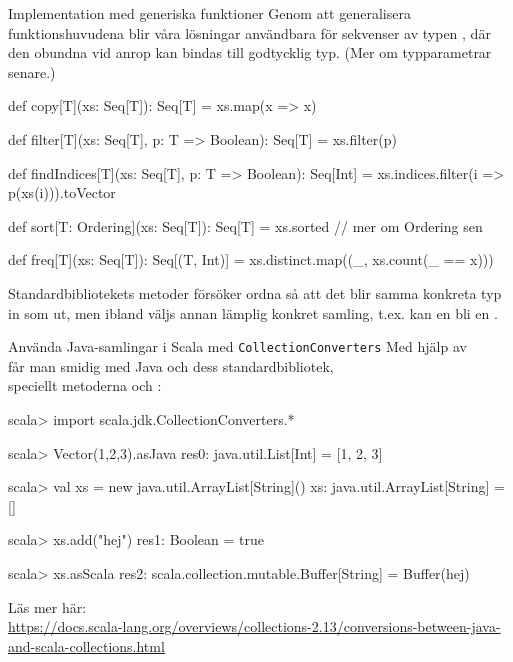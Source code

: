 \begin{Slide}{Implementation med generiska funktioner}\SlideFontSmall
Genom att generalisera funktionshuvudena blir våra lösningar användbara för  sekvenser av typen , där den obundna   vid anrop kan bindas till godtycklig typ. (Mer om typparametrar senare.)
\begin{Code}
def copy[T](xs: Seq[T]): Seq[T] = xs.map(x => x)

def filter[T](xs: Seq[T], p: T => Boolean): Seq[T] = xs.filter(p)

def findIndices[T](xs: Seq[T], p: T => Boolean): Seq[Int] =
  xs.indices.filter(i => p(xs(i))).toVector

def sort[T: Ordering](xs: Seq[T]): Seq[T] = xs.sorted // mer om Ordering sen

def freq[T](xs: Seq[T]): Seq[(T, Int)] =
  xs.distinct.map((_, xs.count(_ == x)))
\end{Code}
\pause
Standardbibliotekets metoder försöker ordna så att det blir samma konkreta typ in som ut, men ibland väljs annan lämplig konkret samling, t.ex. kan en  bli en . 
\end{Slide}

\begin{Slide}{Använda Java-samlingar i Scala med \texttt{CollectionConverters}}\SlideFontSmall
Med hjälp av  \\
får man smidig  med Java och dess standardbibliotek, \\
speciellt metoderna  och :
\begin{REPL}
scala> import scala.jdk.CollectionConverters.*

scala> Vector(1,2,3).asJava
res0: java.util.List[Int] = [1, 2, 3]

scala> val xs = new java.util.ArrayList[String]()
xs: java.util.ArrayList[String] = []

scala> xs.add("hej")
res1: Boolean = true

scala> xs.asScala
res2: scala.collection.mutable.Buffer[String] = Buffer(hej)
\end{REPL}

\noindent Läs mer här: %
\ifkompendium\\\fi%
\scriptsize%
\url{https://docs.scala-lang.org/overviews/collections-2.13/conversions-between-java-and-scala-collections.html}

\end{Slide}


